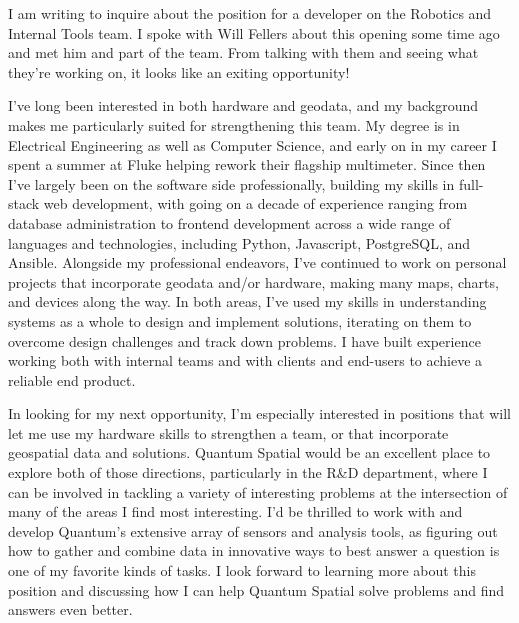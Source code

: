 \documentclass[10pt,stdletter,dateno,sigleft]{newlfm} %
\begin{document}
\begin{newlfm}


I am writing to inquire about the position for a developer on the Robotics and Internal Tools team. I spoke with Will Fellers about this opening some time ago and met him and part of the team. From talking with them and seeing what they're working on, it looks like an exiting opportunity!

I've long been interested in both hardware and geodata, and my background makes me particularly suited for strengthening this team. My degree is in Electrical Engineering as well as Computer Science, and early on in my career I spent a summer at Fluke helping rework their flagship multimeter. Since then I've largely been on the software side professionally, building my skills in full-stack web development, with going on a decade of experience ranging from database administration to frontend development across a wide range of languages and technologies, including Python, Javascript, PostgreSQL, and Ansible. Alongside my professional endeavors, I've continued to work on personal projects that incorporate geodata and/or hardware, making many maps, charts, and devices along the way. In both areas, I've used my skills in understanding systems as a whole to design and implement solutions, iterating on them to overcome design challenges and track down problems. I have built experience working both with internal teams and with clients and end-users to achieve a reliable end product.

In looking for my next opportunity, I'm especially interested in positions that will let me use my hardware skills to strengthen a team, or that incorporate geospatial data and solutions. Quantum Spatial would be an excellent place to explore both of those directions, particularly in the R\&D department, where I can be involved in tackling a variety of interesting problems at the intersection of many of the areas I find most interesting. I'd be thrilled to work with and develop Quantum's extensive array of sensors and analysis tools, as figuring out how to gather and combine data in innovative ways to best answer a question is one of my favorite kinds of tasks. I look forward to learning more about this position and discussing how I can help Quantum Spatial solve problems and find answers even better.


\end{newlfm}
\end{document}
